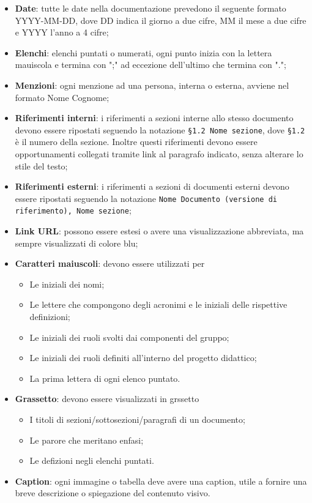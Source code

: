 \begin{itemize}
    \item \textbf{Date}: tutte le date nella documentazione prevedono il seguente formato YYYY-MM-DD, dove DD indica il giorno a due cifre, MM il mese a due cifre e YYYY l'anno a 4 cifre;
    \item \textbf{Elenchi}: elenchi puntati o numerati, ogni punto inizia con la lettera mauiscola e termina con ";" ad eccezione dell'ultimo che termina con ".";
    \item \textbf{Menzioni}: ogni menzione ad una persona, interna o esterna, avviene nel formato Nome Cognome;
    \item \textbf{Riferimenti interni}: i riferimenti a sezioni interne allo stesso documento devono essere ripostati seguendo la notazione \texttt{§1.2 Nome sezione}, dove \texttt{§1.2} è il numero della sezione. Inoltre questi riferimenti devono essere opportunamenti collegati tramite link al paragrafo indicato, senza alterare lo stile del testo;
    \item \textbf{Riferimenti esterni}: i riferimenti a sezioni di documenti esterni devono essere ripostati seguendo la notazione \texttt{Nome Documento (versione di riferimento), Nome sezione};
     \item \textbf{Link URL}: possono essere estesi o avere una visualizzazione abbreviata, ma sempre visualizzati di colore blu;
    \item \textbf{Caratteri maiuscoli}: devono essere utilizzati per
        \begin{itemize}
            \item Le iniziali dei nomi;
            \item Le lettere che compongono degli acronimi e le iniziali delle rispettive definizioni;
            \item Le iniziali dei ruoli svolti dai componenti del gruppo;
            \item Le iniziali dei ruoli definiti all'interno del progetto didattico;
            \item La prima lettera di ogni elenco puntato.
        \end{itemize}
    \item \textbf{Grassetto}: devono essere visualizzati in grssetto
        \begin{itemize}
            \item I titoli di sezioni/sottosezioni/paragrafi di un documento;
            \item Le parore che meritano enfasi;
            \item Le defizioni negli elenchi puntati.
        \end{itemize}
    \item \textbf{Caption}: ogni immagine o tabella deve avere una caption, utile a fornire una breve descrizione o spiegazione del contenuto visivo.
\end{itemize}

